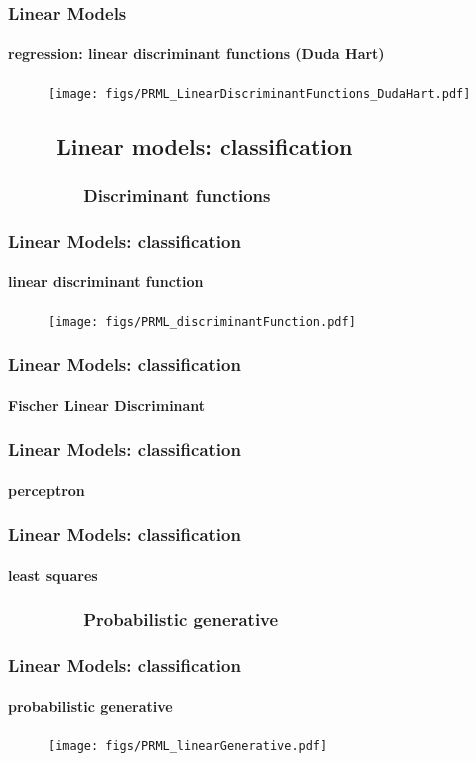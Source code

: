 \begin{frame}
\frametitle{Linear Models}
\framesubtitle{regression: linear discriminant functions (Duda Hart)}
\mypagenum
	\begin{figure}				
		\texttt{[image: figs/PRML\_LinearDiscriminantFunctions\_DudaHart.pdf]}
	\end{figure}	
\end{frame}


\subsection{\ \ \ \ Linear models: classification}

\subsubsection{\ \ \ \ \ \ \ \ Discriminant functions}


\begin{frame}
\frametitle{Linear Models: classification}
\framesubtitle{linear discriminant function }
\logoCSIPCPL\mypagenum
	\begin{figure}				
		\texttt{[image: figs/PRML\_discriminantFunction.pdf]}
	\end{figure}
\end{frame}



\begin{frame}
\frametitle{Linear Models: classification}
\framesubtitle{Fischer Linear Discriminant}
\logoCSIPCPL\mypagenum
\end{frame}


\begin{frame}
\frametitle{Linear Models: classification}
\framesubtitle{perceptron}
\logoCSIPCPL\mypagenum
\end{frame}

\begin{frame}
\frametitle{Linear Models: classification}
\framesubtitle{least squares}
\logoCSIPCPL\mypagenum
\end{frame}


\subsubsection{\ \ \ \ \ \ \ \ Probabilistic generative}
\begin{frame}
\frametitle{Linear Models: classification}
\framesubtitle{probabilistic generative}
\logoCSIPCPL\mypagenum
	\begin{figure}				
		\texttt{[image: figs/PRML\_linearGenerative.pdf]}
	\end{figure}	
\end{frame}



